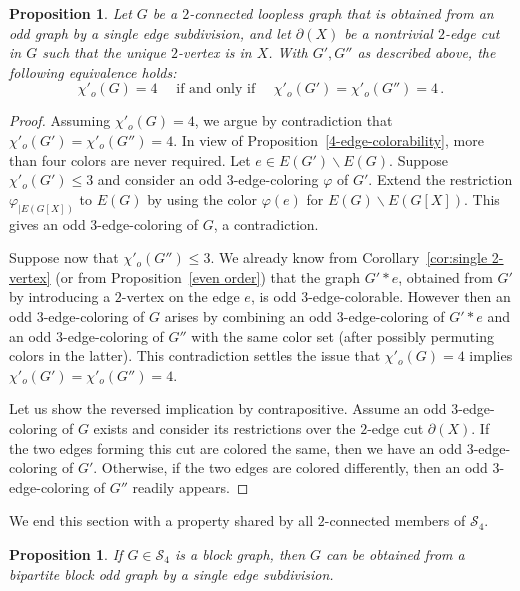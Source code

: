 \documentclass[a4paper,12pt]{article}
\newtheorem{proposition}[theorem]{Proposition}
\numberwithin{equation}{section}
\begin{document}
\begin{proposition}
    \label{glue}
Let $G$ be a $2$-connected loopless graph that is obtained from an odd graph by a single edge subdivision, and let $\partial(X)$ be a nontrivial $2$-edge cut in $G$ such that the unique $2$-vertex is in $X$. With $G',G''$ as described above, the following equivalence holds:
\begin{equation*}
\chi'_o(G)=4 \quad\text{ if and only if }\quad \chi'_o(G')=\chi'_o(G'')=4\,.
\end{equation*}
\end{proposition}
\begin{proof}
Assuming $\chi'_o(G)=4$, we argue by contradiction that $\chi'_o(G')=\chi'_o(G'')=4$. In view of Proposition~\ref{4-edge-colorability}, more than four colors are never required. Let $e\in E(G')\backslash E(G)$. Suppose $\chi'_o(G')\leq3$ and consider an odd $3$-edge-coloring $\varphi$ of $G'$. Extend the restriction $\varphi_{|E(G[X])}$ to $E(G)$ by using the color $\varphi(e)$ for $E(G)\backslash E(G[X])$. This gives an odd $3$-edge-coloring of $G$, a contradiction.

Suppose now that $\chi'_o(G'')\leq3$. We already know from Corollary~\ref{cor:single 2-vertex} (or from Proposition~\ref{even order}) that the graph $G'*e$, obtained from $G'$ by introducing a $2$-vertex on the edge $e$, is odd $3$-edge-colorable. However then an odd $3$-edge-coloring of $G$ arises by combining an odd $3$-edge-coloring of $G'*e$ and an odd $3$-edge-coloring of $G''$ with the same color set (after possibly permuting colors in the latter). This contradiction settles the issue that $\chi'_o(G)=4$ implies $\chi'_o(G')=\chi'_o(G'')=4$.

Let us show the reversed implication by contrapositive. Assume an odd $3$-edge-coloring of $G$ exists and consider its restrictions over the $2$-edge cut $\partial(X)$. If the two edges forming this cut are colored the same, then we have an odd $3$-edge-coloring of $G'$. Otherwise, if the two edges are colored differently, then an odd $3$-edge-coloring of $G''$ readily appears.
\end{proof}

We end this section with a property shared by all $2$-connected members of $\mathcal{S}_4$.

\begin{proposition}
    \label{lema:1}
If $G\in\mathcal{S}_4$ is a block graph, then $G$ can be obtained from a bipartite block odd graph by a single edge subdivision.
\end{proposition}
\end{document}
